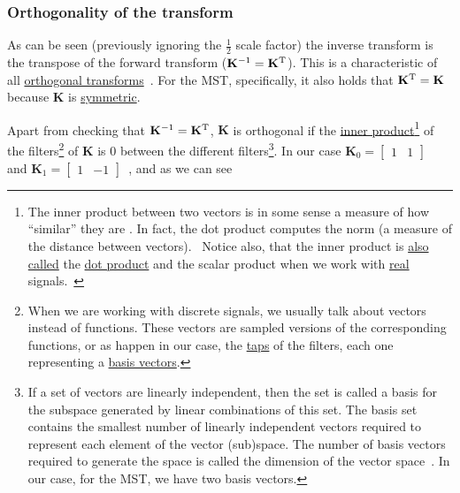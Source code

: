 \subsubsection{Orthogonality of the transform}
As can be seen (previously ignoring the $\frac{1}{2}$ scale factor)
the inverse transform is the transpose of the forward transform
(${\mathbf K}^{-1}={\mathbf K}^{\text T}$). This is a characteristic
of all
\href{https://en.wikipedia.org/wiki/Orthogonal_transformation}{orthogonal
  transforms}~\cite{sayood2017introduction}. For the MST,
specifically, it also holds that ${\mathbf K}^{\text T}={\mathbf K}$
because ${\mathbf K}$ is
\href{https://en.wikipedia.org/wiki/Symmetric_matrix}{symmetric}.

Apart from checking that ${\mathbf K}^{-1}={\mathbf K}^{\text T}$,
${\mathbf K}$ is orthogonal if the
\href{https://en.wikipedia.org/wiki/Inner_product_space}{inner
  product}\footnote{The inner product between two vectors is in some
sense a measure of how ``similar'' they are
\cite{sayood2017introduction}. In fact, the dot product computes the
norm (a measure of the distance between
vectors).~\cite{vetterli2014foundations} Notice also, that the inner
product is
\href{https://math.stackexchange.com/questions/476738/difference-between-dot-product-and-inner-product}{also
  called} the \href{https://en.wikipedia.org/wiki/Dot_product}{dot
  product} and the scalar product when we work with
\href{https://en.wikipedia.org/wiki/Real_number}{real}
signals.~\cite{vetterli2014foundations}} of the filters\footnote{When
we are working with discrete signals, we usually talk about vectors
instead of functions. These vectors are sampled versions of the
corresponding functions, or as happen in our case, the
\href{https://en.wikipedia.org/wiki/Finite_impulse_response}{taps} of
the filters, each one representing a
\href{https://en.wikipedia.org/wiki/Basis_(linear_algebra)}{basis
  vectors}.} of ${\mathbf K}$ is $0$ between the different
filters\footnote{If a set of vectors are linearly independent, then
the set is called a basis for the subspace generated by linear
combinations of this set. The basis set contains the smallest number
of linearly independent vectors required to represent each element of
the vector (sub)space. The number of basis vectors required to
generate the space is called the dimension of the vector
space~\cite{sayood2017introduction}. In our case, for the MST, we have
two basis vectors.}. In our case ${\mathbf K}_0=\begin{bmatrix}1 &
1\end{bmatrix}$~ and ${\mathbf K}_1=\begin{bmatrix} 1 &
-1\end{bmatrix}$~, and as we can see
